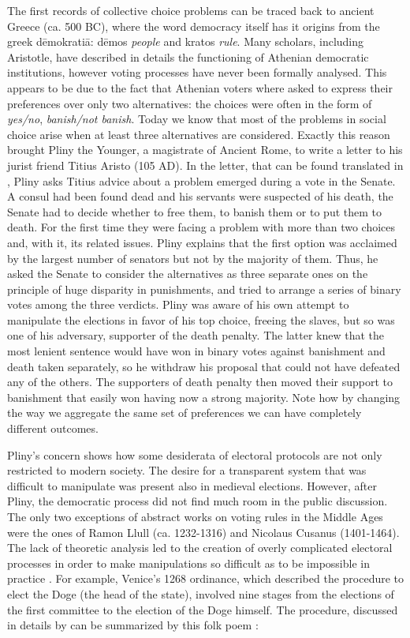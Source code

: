 The first records of collective choice problems can be traced back to ancient Greece (ca. 500 BC), where the word democracy itself has it origins from the greek dēmokratiā: dēmos \textit{people} and kratos \textit{rule}. 
Many scholars, including Aristotle, have described in details the functioning of Athenian democratic institutions, however voting processes have never been formally analysed. This appears to be due to the fact that Athenian voters where asked to express their preferences over only two alternatives: the choices were often in the form of \textit{yes/no}, \textit{banish/not banish}. Today we know that most of the problems in social choice arise when at least three alternatives are considered. Exactly this reason brought Pliny the Younger, a magistrate of Ancient Rome, to write a letter to his jurist friend Titius Aristo (105 AD). In the letter, that can be found translated in \citet[Chapter 2]{McLeanUrken1995}, Pliny asks Titius advice about a problem emerged during a vote in the Senate. A consul had been found dead and his servants were suspected of his death, the Senate had to decide whether to free them, to banish them or to put them to death. For the first time they were facing a problem with more than two choices and, with it, its related issues. Pliny explains that the first option was acclaimed by the largest number of senators but not by the majority of them. Thus, he asked the Senate to consider the alternatives as three separate ones on the principle of huge disparity in punishments, and tried to arrange a series of binary votes among the three verdicts. Pliny was aware of his own attempt to manipulate the elections in favor of his top choice, freeing the slaves, but so was one of his adversary, supporter of the death penalty. The latter knew that the most lenient sentence would have won in binary votes against banishment and death taken separately, so he withdraw his proposal that could not have defeated any of the others. The supporters of death penalty then moved their support to banishment that easily won having now a strong majority. Note how by changing the way we aggregate the same set of preferences we can have completely different outcomes.

Pliny's concern shows how some desiderata of electoral protocols are not only restricted to modern society. The desire for a transparent system that was difficult to manipulate was present also in medieval elections. However, after Pliny, the democratic process did not find much room in the public discussion. The only two exceptions of abstract works on voting rules in the Middle Ages were the ones of Ramon Llull (ca. 1232-1316) and Nicolaus Cusanus (1401-1464). The lack of theoretic analysis led to the creation of overly complicated electoral processes in order to make manipulations so difficult as to be impossible in practice \citep{Uckelman2010}. For example, Venice's 1268 ordinance, which described the procedure to elect the Doge (the head of the state), involved nine stages from the elections of the first committee to the election of the Doge himself. The procedure, discussed in details by \citet{Lines1986, Coggins1998, Mowbray2007} can be summarized by this folk poem \citep{Doglioni1666}:

